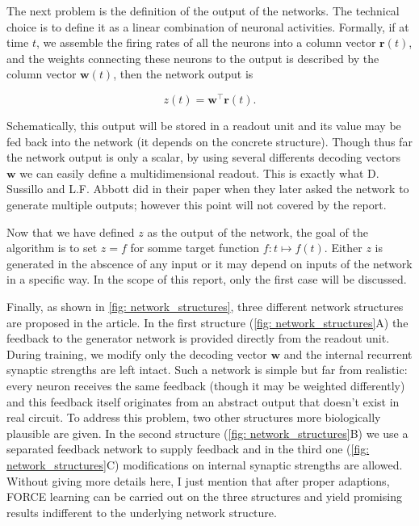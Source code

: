 The next problem is the definition of the output of the networks. The
technical choice is to define it as a linear combination of neuronal
activities. Formally, if at time $t$, we assemble the firing rates of all
the neurons into a column vector $\mathbf{r}(t)$, and the weights 
connecting these neurons to the output is described by the column vector
$\mathbf{w}(t)$, then the network output is

\[z(t) = \mathbf{w}^{\top}\mathbf{r}(t).\]

Schematically, this output will be stored in a readout unit and its
value may be fed back into the network (it depends on the concrete
structure). Though thus far the network output is only a scalar, by using
several differents decoding vectors $\mathbf{w}$ we can easily define
a multidimensional readout. This is exactly what D. Sussillo and L.F.
Abbott did in their paper when they later asked the network to generate
multiple outputs; however this point will not covered by the report.

Now that we have defined $z$ as the output of the network, the goal
of the algorithm is to set $z = f$ for somme target function 
$f: t \mapsto f(t)$. Either $z$ is generated in the abscence of any input
or it may depend on inputs of the network in a specific way. In the scope
of this report, only the first case will be discussed.

Finally, as shown in \autoref{fig: network_structures}, three different 
network structures are proposed in the article. In the first structure
(\autoref{fig: network_structures}A)
the feedback to the generator network is provided directly from the readout
unit. During training, we modify only the decoding vector $\mathbf{w}$
and the internal recurrent synaptic strengths are left intact.
Such a network is simple but far from realistic: every neuron receives the
same feedback (though it may be weighted differently) and this feedback
itself originates from an abstract output that doesn't exist in real circuit.
To address this problem, two other structures more biologically plausible
are given. In the second structure (\autoref{fig: network_structures}B)
we use a separated feedback network to supply feedback and in the third one 
(\autoref{fig: network_structures}C) modifications on internal synaptic
strengths are allowed. Without giving more details here, I just mention 
that after proper adaptions, FORCE learning can be carried out on the
three structures and yield promising results indifferent to the
underlying network structure.

